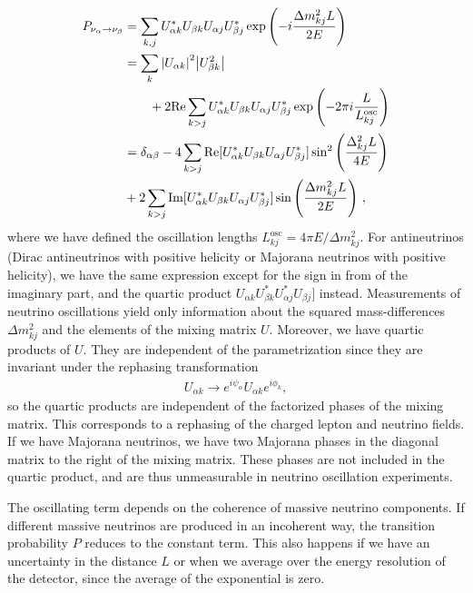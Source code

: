 \documentclass[twocolumn]{article}
\newcommand{\na}{\ensuremath{\nu_\alpha}}
\begin{document}
\begin{align*}
  P_{\na \to \nu_\beta} 
  &= \sum_{k,j} U^*_{\alpha k} U_{\beta k} U_{\alpha j} U^*_{\beta j} \exp\left( -i \frac{\Delta m_{kj}^2 L}{2E}\right) \\
  &= \sum_k \abs{U_{\alpha k}}^2 \abs{U_{\beta k}^2} \\
  & \qquad + 2 \text{Re}\sum_{k>j} U^*_{\alpha k} U_{\beta k} U_{\alpha j} U^*_{\beta j} \exp \left( -2\pi i \frac{L}{L^\text{osc}_{kj}}\right) \\
  &= \delta_{\alpha \beta} - 4\sum_{k > j} \text{Re}[U^*_{\alpha k} U_{\beta k} U_{\alpha j} U^*_{\beta j}] \sin^2\left(\frac{\Delta_{kj}^2L}{4E}\right) \\
  &+ 2\sum_{k>j} \text{Im}[U^*_{\alpha k}U_{\beta k}U_{\alpha j} U^*_{\beta j}]\sin\left( \frac{\Delta m_{kj}^2 L}{2E} \right)
\,,\end{align*}
where we have defined the oscillation lengths $L^\text{osc}_{kj} = 4\pi E / \Delta m_{kj}^2$. For antineutrinos (Dirac antineutrinos with positive helicity or Majorana neutrinos with positive helicity), we have the same expression except for the sign in from of the imaginary part, and the quartic product $U_{\alpha k}U^*_{\beta k}U^*_{\alpha j} U_{\beta j}]$ instead.
Measurements of neutrino oscillations yield only information about the squared mass-differences $\Delta m_{kj}^2$ and the elements of the mixing matrix $U$. Moreover, we have quartic products of $U$. They are independent of the parametrization since they are invariant under the rephasing transformation 
\begin{align*}
  U_{\alpha k} \to e^{i \psi_\alpha} U_{\alpha k} e^{i\phi_k}
,\end{align*}
so the quartic products are independent of the factorized phases of the mixing matrix. This corresponds to a rephasing of the charged lepton and neutrino fields. If we have Majorana neutrinos, we have two Majorana phases in the diagonal matrix to the right of the mixing matrix. These phases are not included in the quartic product, and are thus unmeasurable in neutrino oscillation experiments. 

The oscillating term depends on the coherence of massive neutrino components. If different massive neutrinos are produced in an incoherent way, the transition probability $P$ reduces to the constant term. This also happens if we have an uncertainty in the distance $L$ or when we average over the energy resolution of the detector, since the average of the exponential is zero.
\end{document}
